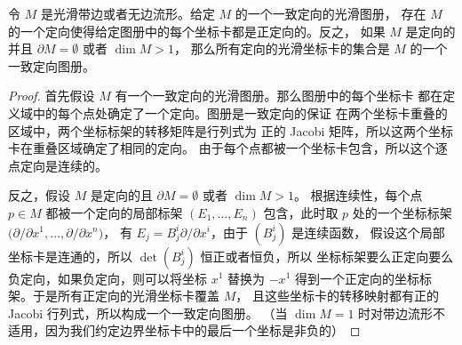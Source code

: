 \begin{proposition}[通过坐标图册确定的定向]
  令 $M$ 是光滑带边或者无边流形。给定 $M$ 的一个一致定向的光滑图册，
  存在 $M$ 的一个定向使得给定图册中的每个坐标卡都是正定向的。反之，
  如果 $M$ 是定向的并且 $\partial M=\emptyset$ 或者 $\dim M>1$，
  那么所有定向的光滑坐标卡的集合是 $M$ 的一个一致定向图册。
\end{proposition}
\begin{proof}
  首先假设 $M$ 有一个一致定向的光滑图册。那么图册中的每个坐标卡
  都在定义域中的每个点处确定了一个定向。图册是一致定向的保证
  在两个坐标卡重叠的区域中，两个坐标标架的转移矩阵是行列式为
  正的 Jacobi 矩阵，所以这两个坐标卡在重叠区域确定了相同的定向。
  由于每个点都被一个坐标卡包含，所以这个逐点定向是连续的。

  反之，假设 $M$ 是定向的且 $\partial M=\emptyset$ 或者 $\dim M>1$。
  根据连续性，每个点 $p\in M$ 都被一个定向的局部标架 $(E_1,\dots,E_n)$
  包含，此时取 $p$ 处的一个坐标标架 $\bigl(\partial/\partial x^1,\dots,\partial/\partial x^n\bigr)$，
  有 $E_j=B^i_j\partial/\partial x^i$，由于 $(B_j^i)$ 是连续函数，
  假设这个局部坐标卡是连通的，所以 $\det(B_j^i)$ 恒正或者恒负，所以
  坐标标架要么正定向要么负定向，如果负定向，则可以将坐标 $x^1$ 替换为 
  $-x^1$ 得到一个正定向的坐标标架。于是所有正定向的光滑坐标卡覆盖 $M$，
  且这些坐标卡的转移映射都有正的 Jacobi 行列式，所以构成一个一致定向图册。
  （当 $\dim M=1$ 时对带边流形不适用，因为我们约定边界坐标卡中的最后一个坐标是非负的）
\end{proof}

